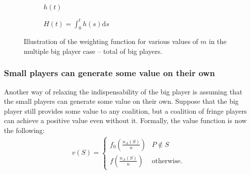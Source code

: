 \documentclass[a4paper]{article}
\newcommand{\ds}{\mathrm{d}s}
\begin{document}
\begin{figure}[ht]
    \centering
    \begin{subfigure}[b]{0.45\textwidth}
        \centering
        \caption{$h(t)$}
    \end{subfigure}
    \begin{subfigure}[b]{0.45\textwidth}
        \centering
        \caption{$H(t) = \int_0^t h(s) \ds$}
    \end{subfigure}
    \caption{Illustration of the weighting function for various values of $m$ in the multiple big player case -- total of big players.}
    \label{fig:multiple_platforms_total}
\end{figure}


\subsubsection{Small players can generate some value on their own}

Another way of relaxing the indispensability of the big player is assuming that the small players can generate some value on their own.
Suppose that the big player still provides some value to any coalition, but a coalition of fringe players can achieve a positive value even without it.
Formally, the value function is now the following:
\begin{align*}
    v(S) = \begin{cases}
        f_0\left(\frac{n_A(S)}{n}\right) & P \notin S \\
        f\left(\frac{n_A(S)}{n}\right)   & \text{otherwise}.
    \end{cases}
\end{align*}
\end{document}
